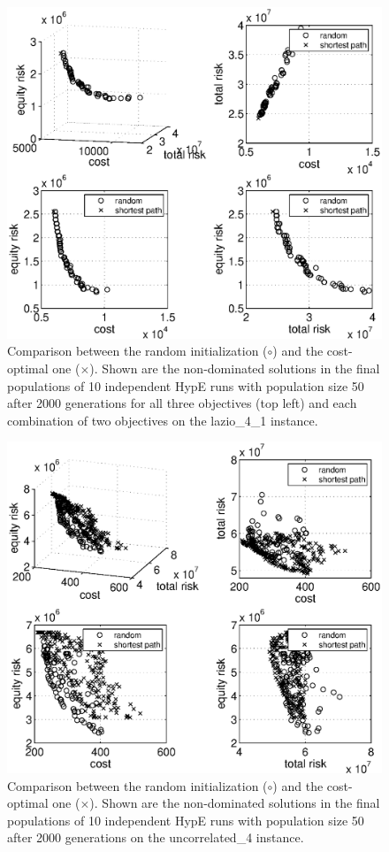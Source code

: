 \documentclass[preprint,12pt]{elsarticle}
\begin{document}
\begin{figure}
	\centering
	\includegraphics[width=0.75\columnwidth]{../experiments/randVsCost/randVsCost_ns4_1_OriginalCost_2000gens.eps}
	\vspace{-1em}
	\caption{\label{fig:randVsCostOriginal} Comparison between the random initialization ($\circ$) and the cost-optimal one ($\times$). Shown are the non-dominated solutions in the final populations of 10 independent HypE runs with population size 50 after 2000 generations for all three objectives (top left) and each combination of two objectives on the lazio\_4\_1 instance.}
\end{figure}

\begin{figure}
	\centering
	\includegraphics[width=0.75\columnwidth]{../experiments/randVsCost/randVsCost_ns4_1_New_2000gens.eps}
	\vspace{-1em}
	\caption{\label{fig:randVsCostNew} Comparison between the random initialization ($\circ$) and the cost-optimal one ($\times$). Shown are the non-dominated solutions in the final populations of 10 independent HypE runs with population size 50 after 2000 generations on the uncorrelated\_4 instance.}
\end{figure}
\end{document}

